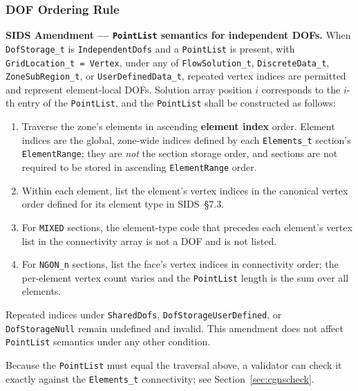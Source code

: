 \documentclass[11pt,letterpaper]{article}
\begin{document}
\subsubsection{DOF Ordering Rule}
\label{sec:ordering-rule}

\textbf{SIDS Amendment ---
\texttt{PointList} semantics for independent DOFs.}
When \texttt{DofStorage\_t} is \texttt{IndependentDofs} and a
\texttt{PointList} is present, with
\texttt{GridLocation\_t = Vertex}, under any of
\texttt{FlowSolution\_t}, \texttt{DiscreteData\_t},
\texttt{ZoneSubRegion\_t}, or \texttt{UserDefinedData\_t},
repeated vertex indices are
permitted and represent element-local DOFs.  Solution array position
$i$ corresponds to the $i$-th entry of the \texttt{PointList}, and the
\texttt{PointList} shall be constructed as follows:

\begin{enumerate}[leftmargin=2em]
\item Traverse the zone's elements in ascending \textbf{element index}
  order.  Element indices are the global, zone-wide indices defined by
  each \texttt{Elements\_t} section's \texttt{ElementRange}; they are
  \emph{not} the section storage order, and sections are not required
  to be stored in ascending \texttt{ElementRange} order.

\item Within each element, list the element's vertex indices in the
  canonical vertex order defined for its element type in
  SIDS~\S7.3.

\item For \texttt{MIXED} sections, the element-type code that precedes
  each element's vertex list in the connectivity array is not a DOF and
  is not listed.

\item For \texttt{NGON\_n} sections, list the face's vertex indices in
  connectivity order; the per-element vertex count varies and the
  \texttt{PointList} length is the sum over all elements.
\end{enumerate}

Repeated indices under \texttt{SharedDofs},
\texttt{DofStorageUserDefined}, or \texttt{DofStorageNull} remain
undefined and invalid.  This amendment does not affect
\texttt{PointList} semantics under any other condition.

Because the \texttt{PointList} must equal the traversal above, a
validator can check it exactly against the \texttt{Elements\_t}
connectivity; see Section~\ref{sec:cgnscheck}.
\end{document}
